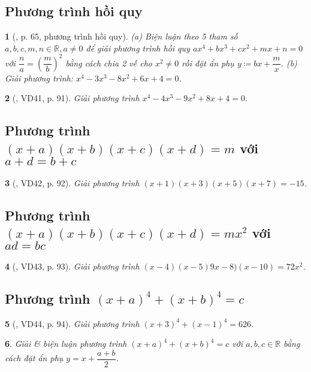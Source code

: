 \documentclass{article}
\newtheorem{baitoan}{}
\begin{document}
\subsection{Phương trình hồi quy}

\begin{baitoan}[\cite{Binh_boi_duong_Toan_9_tap_2}, p. 65, phương trình hồi quy]
	(a) Biện luận theo 5 tham số $a,b,c,m,n\in\mathbb{R},a\ne0$ để giải phương trình hồi quy $ax^4 + bx^3 + cx^2 + mx + n = 0$ với $\dfrac{n}{a} = \left(\dfrac{m}{b}\right)^2$ bằng cách chia 2 vế cho $x^2\ne0$ rồi đặt ẩn phụ $y\coloneqq bx + \dfrac{m}{x}$. (b) Giải phương trình: $x^4 - 3x^3 - 8x^2 + 6x + 4 = 0$.
\end{baitoan}

\begin{baitoan}[\cite{Tuyen_Toan_9_old}, VD41, p. 91]
	Giải phương trình $x^4 - 4x^3 - 9x^2 + 8x + 4 = 0$.
\end{baitoan}

\subsection{Phương trình $(x + a)(x + b)(x + c)(x + d) = m$ với $a + d = b + c$}

\begin{baitoan}[\cite{Tuyen_Toan_9_old}, VD42, p. 92]
	Giải phương trình $(x + 1)(x + 3)(x + 5)(x + 7) = -15$.
\end{baitoan}

\subsection{Phương trình $(x + a)(x + b)(x + c)(x + d) = mx^2$ với $ad = bc$}

\begin{baitoan}[\cite{Tuyen_Toan_9_old}, VD43, p. 93]
	Giải phương trình $(x - 4)(x - 5)9x - 8)(x - 10) = 72x^2$.
\end{baitoan}

\subsection{Phương trình $(x + a)^4 + (x + b)^4 = c$}

\begin{baitoan}[\cite{Tuyen_Toan_9_old}, VD44, p. 94]
	Giải phương trình $(x + 3)^4 + (x - 1)^4 = 626$.
\end{baitoan}

\begin{baitoan}
	Giải \& biện luận phương trình $(x + a)^4 + (x + b)^4 = c$ với $a,b,c\in\mathbb{R}$ bằng cách đặt ẩn phụ $y = x + \dfrac{a + b}{2}$.
\end{baitoan}
\end{document}
